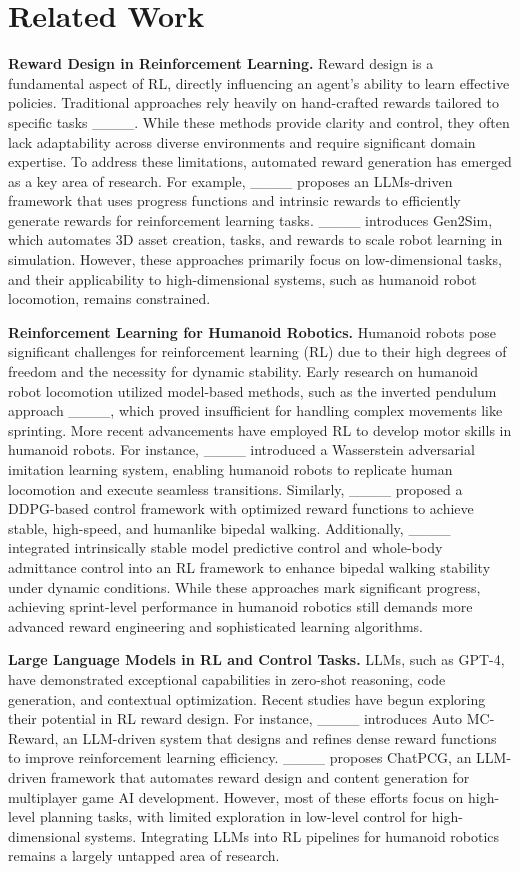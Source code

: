 \section{Related Work}
\label{Related_Work}

\textbf{Reward Design in Reinforcement Learning.}
Reward design is a fundamental aspect of RL, directly influencing an agent’s ability to learn effective policies. Traditional approaches rely heavily on hand-crafted rewards tailored to specific tasks ____. While these methods provide clarity and control, they often lack adaptability across diverse environments and require significant domain expertise. To address these limitations, automated reward generation has emerged as a key area of research. For example, ____ proposes an LLMs-driven framework that uses progress functions and intrinsic rewards to efficiently generate rewards for reinforcement learning tasks. ____ introduces Gen2Sim, which automates 3D asset creation, tasks, and rewards to scale robot learning in simulation. However, these approaches primarily focus on low-dimensional tasks, and their applicability to high-dimensional systems, such as humanoid robot locomotion, remains constrained.

\textbf{Reinforcement Learning for Humanoid Robotics.}  
Humanoid robots pose significant challenges for reinforcement learning (RL) due to their high degrees of freedom and the necessity for dynamic stability. Early research on humanoid robot locomotion utilized model-based methods, such as the inverted pendulum approach ____, which proved insufficient for handling complex movements like sprinting. More recent advancements have employed RL to develop motor skills in humanoid robots. For instance, ____ introduced a Wasserstein adversarial imitation learning system, enabling humanoid robots to replicate human locomotion and execute seamless transitions. Similarly, ____ proposed a DDPG-based control framework with optimized reward functions to achieve stable, high-speed, and humanlike bipedal walking. Additionally, ____ integrated intrinsically stable model predictive control and whole-body admittance control into an RL framework to enhance bipedal walking stability under dynamic conditions. While these approaches mark significant progress, achieving sprint-level performance in humanoid robotics still demands more advanced reward engineering and sophisticated learning algorithms.

\textbf{Large Language Models in RL and Control Tasks.}
LLMs, such as GPT-4, have demonstrated exceptional capabilities in zero-shot reasoning, code generation, and contextual optimization. Recent studies have begun exploring their potential in RL reward design. For instance, ____ introduces Auto MC-Reward, an LLM-driven system that designs and refines dense reward functions to improve reinforcement learning efficiency. ____ proposes ChatPCG, an LLM-driven framework that automates reward design and content generation for multiplayer game AI development. However, most of these efforts focus on high-level planning tasks, with limited exploration in low-level control for high-dimensional systems. Integrating LLMs into RL pipelines for humanoid robotics remains a largely untapped area of research.

